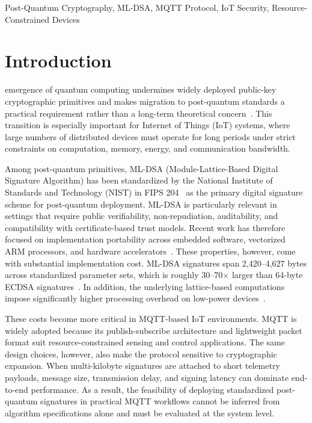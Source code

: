 \documentclass[final, twoside]{IEEEtran} %
\begin{document}
\begin{IEEEkeywords}
	Post-Quantum Cryptography, ML-DSA, MQTT Protocol, IoT Security, Resource-Constrained Devices
\end{IEEEkeywords}

\section{Introduction}

 emergence of quantum computing undermines widely deployed public-key cryptographic primitives and makes migration to post-quantum standards a practical requirement rather than a long-term theoretical concern~\cite{Khalid2019,Dinu2025,Egbuagha2025}. This transition is especially important for Internet of Things (IoT) systems, where large numbers of distributed devices must operate for long periods under strict constraints on computation, memory, energy, and communication bandwidth.

\IEEEpubidadjcol

Among post-quantum primitives, ML-DSA (Module-Lattice-Based Digital Signature Algorithm) has been standardized by the National Institute of Standards and Technology (NIST) in FIPS 204~\cite{NIST-FIPS-204} as the primary digital signature scheme for post-quantum deployment. ML-DSA is particularly relevant in settings that require public verifiability, non-repudiation, auditability, and compatibility with certificate-based trust models. Recent work has therefore focused on implementation portability across embedded software, vectorized ARM processors, and hardware accelerators~\cite{Barrett2023,Wei2025,Norga2025}. These properties, however, come with substantial implementation cost. ML-DSA signatures span 2,420--4,627 bytes across standardized parameter sets, which is roughly 30--70$\times$ larger than 64-byte ECDSA signatures~\cite{NIST-FIPS-204}. In addition, the underlying lattice-based computations impose significantly higher processing overhead on low-power devices~\cite{Ghosh2019,Benchmark2022,pqm4-benchmarks}.

These costs become more critical in MQTT-based IoT environments. MQTT is widely adopted because its publish-subscribe architecture and lightweight packet format suit resource-constrained sensing and control applications. The same design choices, however, also make the protocol sensitive to cryptographic expansion. When multi-kilobyte signatures are attached to short telemetry payloads, message size, transmission delay, and signing latency can dominate end-to-end performance. As a result, the feasibility of deploying standardized post-quantum signatures in practical MQTT workflows cannot be inferred from algorithm specifications alone and must be evaluated at the system level.
\end{document}
